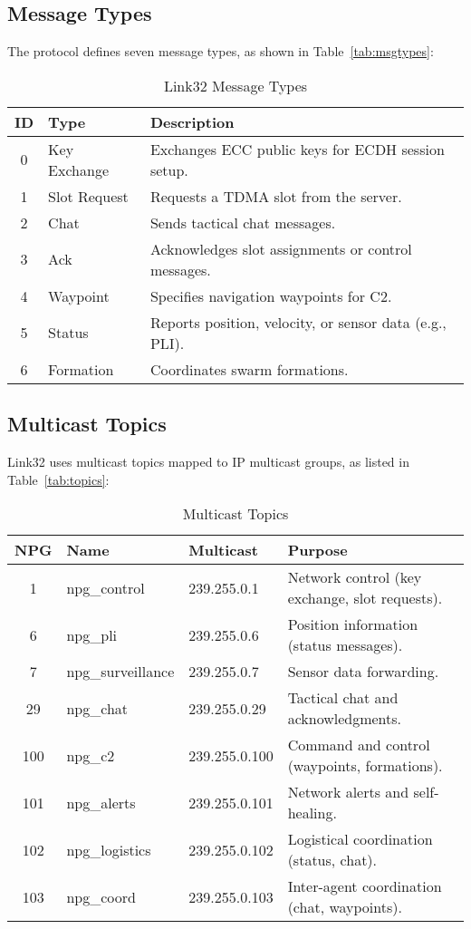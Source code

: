 \documentclass{article}
\begin{document}
\subsection{Message Types}
The protocol defines seven message types, as shown in Table~\ref{tab:msgtypes}:
\begin{table}[h]
\centering
\caption{Link32 Message Types}
\begin{tabular}{cll}
\hline
\textbf{ID} & \textbf{Type} & \textbf{Description} \\
\hline
0 & Key Exchange & Exchanges ECC public keys for ECDH session setup. \\
1 & Slot Request & Requests a TDMA slot from the server. \\
2 & Chat & Sends tactical chat messages. \\
3 & Ack & Acknowledges slot assignments or control messages. \\
4 & Waypoint & Specifies navigation waypoints for C2. \\
5 & Status & Reports position, velocity, or sensor data (e.g., PLI). \\
6 & Formation & Coordinates swarm formations. \\
\hline
\end{tabular}
\end{table}

\subsection{Multicast Topics}
Link32 uses multicast topics mapped to IP multicast groups, as listed in Table~\ref{tab:topics}:
\begin{table}[h]
\centering
\caption{Multicast Topics}
\begin{tabular}{clll}
\hline
\textbf{NPG} & \textbf{Name} & \textbf{Multicast} & \textbf{Purpose} \\
\hline
1 & npg\_control & 239.255.0.1 & Network control (key exchange, slot requests). \\
6 & npg\_pli & 239.255.0.6 & Position information (status messages). \\
7 & npg\_surveillance & 239.255.0.7 & Sensor data forwarding. \\
29 & npg\_chat & 239.255.0.29 & Tactical chat and acknowledgments. \\
100 & npg\_c2 & 239.255.0.100 & Command and control (waypoints, formations). \\
101 & npg\_alerts & 239.255.0.101 & Network alerts and self-healing. \\
102 & npg\_logistics & 239.255.0.102 & Logistical coordination (status, chat). \\
103 & npg\_coord & 239.255.0.103 & Inter-agent coordination (chat, waypoints). \\
\hline
\end{tabular}
\end{table}
\end{document}
